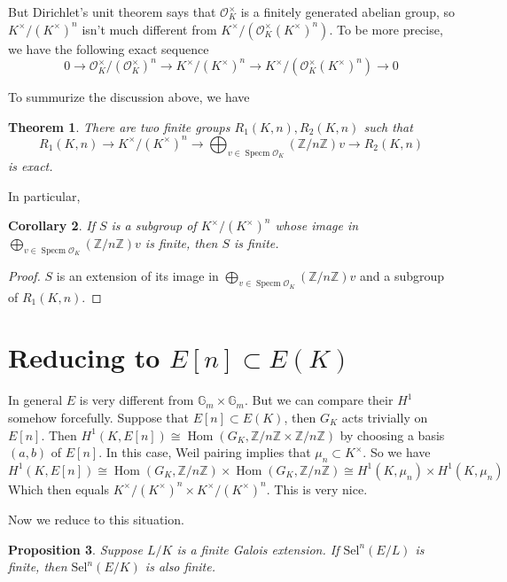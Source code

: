 \documentclass{article}
\newtheorem{thm}{Theorem}
\newtheorem{cor}[thm]{Corollary}
\newtheorem{prop}[thm]{Proposition}
\newcommand{\ord}{\mathcal{O}}
\newcommand{\mn}{\mu_{n}}
\newcommand{\kmkn}{K ^{\times} / (K ^{\times})^{n}}
\DeclareMathOperator{\hhom}{Hom}
\DeclareMathOperator{\spec}{Specm}
\begin{document}
But Dirichlet's unit theorem says that
$ \ord _{K}^{\times} $ is a finitely generated abelian group,
so $ \kmkn $ isn't much different from $ K ^{\times}/(\ord _{K}^{\times} (K ^{\times})^{n}) $.
To be more precise, we have the following exact sequence
$$ 0\to \ord _{K}^{\times}/ (\ord _{K}^{\times})^{n} \to
\kmkn \to K ^{\times}/(\ord _{K}^{\times} (K ^{\times})^{n})\to 0$$

To summurize the discussion above, we have
\begin{thm}
There are two finite groups $ R _{1}(K, n), R _{2}(K, n) $ such that
$$ R _{1}(K, n)\to \kmkn \to  
\bigoplus _{v\in \spec \ord _{K}} (\mathbb{Z}/n \mathbb{Z}) v \to R _{2}(K, n) $$
is exact.
\end{thm}
In particular,
\begin{cor}
If $ S $ is a subgroup of $ \kmkn $ whose image in
$ \bigoplus _{v\in \spec \ord _{K}} (\mathbb{Z}/n \mathbb{Z}) v$ is finite,
then $ S $ is finite.
\end{cor}

\begin{proof}
$ S $ is an extension of its image in
$ \bigoplus _{v\in \spec \ord _{K}} (\mathbb{Z}/n \mathbb{Z}) v$ and a subgroup of
$ R _{1}(K, n) $.
\end{proof}

\section{Reducing to $ E [n]\subset E (K) $}

In general $ E $ is very different from $ \mathbb{G}_{m}\times \mathbb{G}_{m} $.
But we can compare their $ H ^{1} $ somehow forcefully.
Suppose that $ E [n] \subset E (K) $, then $ G _{K} $ acts trivially on $ E [n] $.
Then $ H ^{1}(K, E [n]) \cong \hhom (G _{K}, \mathbb{Z}/n \mathbb{Z} \times \mathbb{Z}/n \mathbb{Z})$
by choosing a basis $ (a, b) $ of $ E [n] $.
In this case, Weil pairing implies that $ \mn \subset K ^{\times} $.
So we have
$$ H ^{1}(K, E [n]) \cong \hhom (G _{K}, \mathbb{Z}/n \mathbb{Z})\times
\hhom (G _{K}, \mathbb{Z}/n \mathbb{Z})\cong H ^{1}(K, \mn)\times H ^{1}(K, \mn)
$$
Which then equals $ \kmkn\times \kmkn $.
This is very nice.

Now we reduce to this situation.
\begin{prop}
Suppose $ L/K $ is a finite Galois extension.
If $ \mathrm{Sel}^{n}(E/L) $ is finite, then
$ \mathrm{Sel}^{n}(E/K) $ is also finite.
\end{prop}
\end{document}

